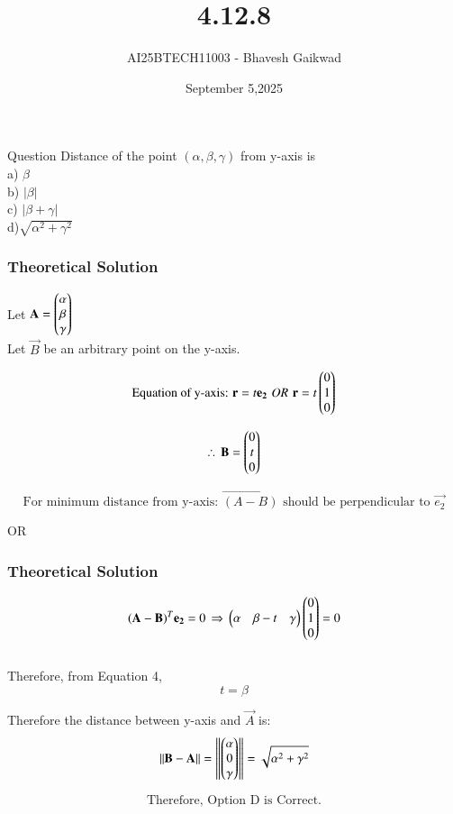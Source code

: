 \documentclass{beamer}
\title
{4.12.8}
\date{September 5,2025}
\author 
{AI25BTECH11003 - Bhavesh Gaikwad}
\begin{document}
\frame{\titlepage}
\begin{frame}{Question}
Distance of the point $(\alpha, \beta, \gamma)$ from y-axis is\\
a) $\beta$\\
b) $|\beta|$\\
c) $|\beta + \gamma|$\\
d)$\sqrt{\alpha^2 + \gamma^2}$ \\
\end{frame}


\begin{frame}[fragile]
    \frametitle{Theoretical Solution}
Let $\mathbf{A} = \begin{pmatrix}\alpha \\ \beta \\ \gamma\end{pmatrix}$\\ 
Let $\vec{B}$ be an arbitrary point on the y-axis.

\begin{equation}
    \text{Equation of y-axis: } \mathbf{r} = t\mathbf{e_2} \, \,
    OR \, \, \mathbf{r}=t\begin{pmatrix}0 \\ 1 \\ 0\end{pmatrix}
\end{equation}

\begin{equation}
\therefore \, \mathbf{B}=\begin{pmatrix}0 \\ t \\0\end{pmatrix}
\end{equation}

\begin{equation}
\text{For minimum distance from y-axis: } \vec{(A-B)} \text{ should be perpendicular to } \vec{e_2}
\end{equation}

\begin{center}
    OR
\end{center}

\end{frame}

\begin{frame}[fragile]
\frametitle{Theoretical Solution}

\begin{equation}
\mathbf{(A-B)}^T\mathbf{e_2} =0 \, \Rightarrow \, \begin{pmatrix}\alpha & \beta-t & \gamma\end{pmatrix}\begin{pmatrix}0 \\ 1 \\ 0\end{pmatrix} = 0     
\end{equation}\\

Therefore, from Equation 4,
\begin{equation}
t=\beta
\end{equation}

Therefore the distance between y-axis and $\vec{A}$ is:
\begin{equation}
    \left\lVert\mathbf{B-A}\right\rVert  = \left\lVert\begin{pmatrix}\alpha \\ 0 \\ \gamma\end{pmatrix}\right\rVert = \sqrt{\alpha^2 + \gamma^2}
\end{equation}

\begin{equation}
\boxed{\text{Therefore, Option D is Correct.}}    
\end{equation}
\end{frame}
\end{document}
